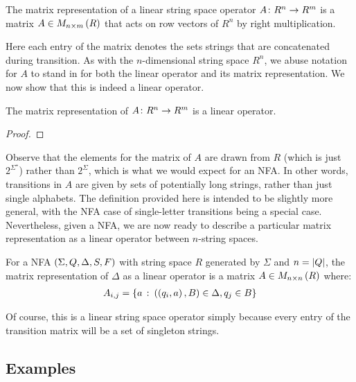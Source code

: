 \documentclass[12pt]{article}
\begin{document}
\begin{definition}
  The matrix representation of a linear string space operator
  \(A \colon R^n \to R^m\) is a matrix
  \(A \in M_{n \times m} \left(R\right)\) that
  acts on row vectors of \(R^n\) by right multiplication.
\end{definition}

Here each entry of the matrix denotes the sets strings that are
concatenated during transition.
As with the \(n\)-dimensional string space \(R^n\),
we abuse notation for \(A\) to stand in for
both the linear operator and its matrix representation.
We now show that this is indeed a linear operator.

\begin{theorem}
  The matrix representation of \(A \colon R^n \to R^m\) is a linear operator.
\end{theorem}
\begin{proof}
\end{proof}

Observe that the elements for the matrix of \(A\) are drawn from
\(R\) (which is just \(2^{\Sigma^\star}\))
rather than \(2^{\Sigma}\),
which is what we would expect for an NFA.
In other words, transitions in \(A\) are given by sets of potentially
long strings, rather than just single alphabets.
The definition provided here is intended to be slightly more general,
with the NFA case of single-letter transitions being a special case.
Nevertheless,
given a NFA, we are now ready to describe a particular matrix representation
as a linear operator between \(n\)-string spaces.

\begin{definition}
  For a NFA \(\left(\Sigma, Q, \Delta, S, F\right)\) with
  string space \(R\) generated by \(\Sigma\) and \(n = \left\lvert Q\right\rvert\),
  the matrix representation of \(\Delta\) as a linear operator
  is a matrix
  \(A \in M_{n \times n} \left(R\right)\)  where:
  \begin{align*}
    A_{i, j}
      = \left\{a \ \colon \left(\left(q_i, a\right), B\right) \in \Delta, q_j \in B\right\}
  \end{align*}
\end{definition}

Of course, this is a linear string space operator simply because
every entry of the transition matrix will be a set of singleton strings.



\subsection{Examples}
\end{document}
